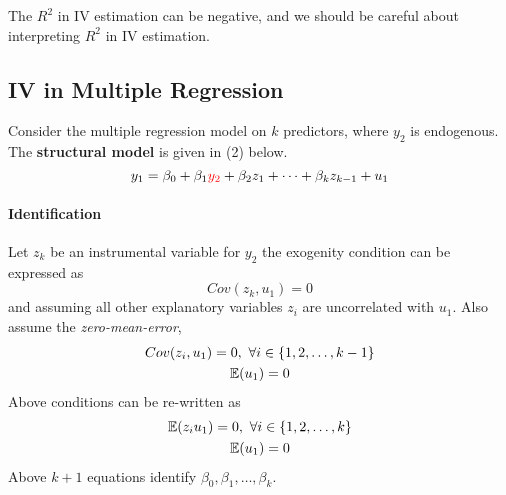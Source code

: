 \documentclass[]{article}
\begin{document}
				\begin{remark}
					The $R^2$ in IV estimation can be negative, and we should be careful about interpreting $R^2$ in IV estimation.
				\end{remark}
			\subsection{IV in Multiple Regression}
			\par Consider the multiple regression model on $k$ predictors, where $y_2$ is endogenous. The \textbf{structural model} is given in (2) below.
			\begin{equation}
				y_1 = \beta_0 + \beta_1 \textcolor{red}{y_2} + \beta_2 z_1 + \cdots + \beta_k z_{k-1} + u_1
			\end{equation}
			\paragraph{Identification} Let $z_k$ be an instrumental variable for $y_2$ the exogenity condition can be expressed as
			\[
				Cov(z_k, u_1) = 0
			\]
			and assuming all other explanatory variables $z_i$ are uncorrelated with $u_1$. Also assume the \emph{zero-mean-error},
			\begin{gather*}
				Cov(z_i, u_1) = 0,\ \forall i \in \{1, 2, \dots, k - 1\} \\
				\mathbb{E}({u_1}) = 0
			\end{gather*}
			Above conditions can be re-written as 
			\begin{gather*}
				\mathbb{E}({z_i u_1}) = 0,\ \forall i \in \{1,2, \dots, k\} \\
				\mathbb{E}({u_1}) = 0
			\end{gather*}
			Above $k+1$ equations identify $\beta_0, \beta_1, \dots, \beta_k$.
			
\end{document}

